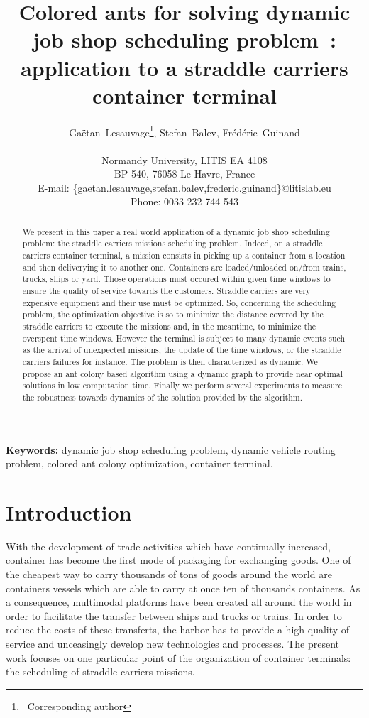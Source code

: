 \documentclass[a4paper,10pt]{article}
\title{Colored ants for solving dynamic job shop scheduling problem : application to a straddle carriers container terminal
}
\author{Ga\"{e}tan~Lesauvage\thanks{~Corresponding author}, Stefan~Balev, Fr\'{e}d\'{e}ric~Guinand\\\\
\medskip
Normandy University, LITIS EA 4108\\
BP 540, 76058 Le Havre, France\\
\medskip
E-mail: \{gaetan.lesauvage,stefan.balev,frederic.guinand\}@litislab.eu\\
\medskip
Phone: 0033 232 744 543
}
\begin{document}
\maketitle

\begin{abstract}
We present in this paper a real world application of a dynamic job shop scheduling problem: the straddle carriers missions scheduling problem. Indeed, on a straddle carriers container terminal, a mission consists in picking up a container from a location and then deliverying it to another one. Containers are loaded/unloaded on/from trains, trucks, ships or yard. Those operations must occured within given time windows to ensure the quality of service towards the customers. Straddle carriers are very expensive equipment and their use must be optimized. So, concerning the scheduling problem, the optimization objective is so to minimize the distance covered by the straddle carriers to execute the missions and, in the meantime, to minimize the overspent time windows.
However the terminal is subject to many dynamic events such as the arrival of unexpected missions, the update of the time windows, or the straddle carriers failures for instance. The problem is then characterized as dynamic.
We propose an ant colony based algorithm using a dynamic graph to provide near optimal solutions in low computation time.
Finally we perform several experiments to measure the robustness towards dynamics of the solution provided by the algorithm.
\end{abstract}

{\bf Keywords: } dynamic job shop scheduling problem, dynamic vehicle routing problem, colored ant colony optimization, container terminal.\\

\section{Introduction}

With the development of trade activities which have continually increased, container has become the first mode of packaging for exchanging goods. One of the cheapest way to carry thousands of tons of goods around the world are containers vessels which are able to carry at once ten of thousands containers. As a consequence, multimodal platforms have been created all around the world in order to facilitate the transfer between ships and trucks or trains. In order to reduce the costs of these transferts, the harbor has to provide a high quality of service and unceasingly develop new technologies and processes. The present work focuses on one particular point of the organization of container terminals: the scheduling of straddle carriers missions.\\
\end{document}
